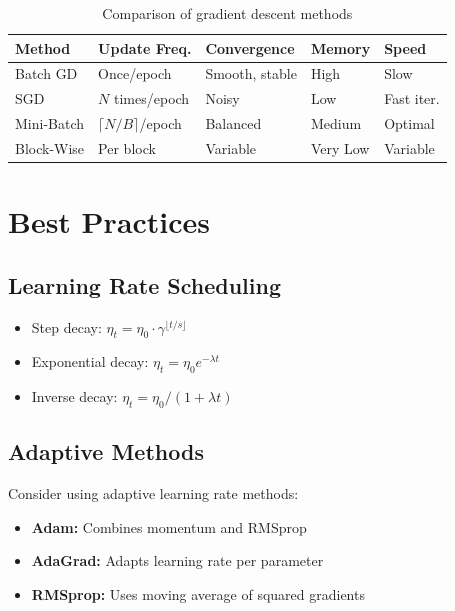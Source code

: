 \documentclass{tufte-handout}
\begin{document}
\begin{table}[h]
\centering
\begin{tabular}{|l|l|l|l|l|}
\hline
\textbf{Method} & \textbf{Update Freq.} & \textbf{Convergence} & \textbf{Memory} & \textbf{Speed} \\
\hline
Batch GD & Once/epoch & Smooth, stable & High & Slow \\
\hline
SGD & $N$ times/epoch & Noisy & Low & Fast iter. \\
\hline
Mini-Batch & $\lceil N/B \rceil$/epoch & Balanced & Medium & Optimal \\
\hline
Block-Wise & Per block & Variable & Very Low & Variable \\
\hline
\end{tabular}
\caption{Comparison of gradient descent methods}
\end{table}

\section{Best Practices}

\subsection{Learning Rate Scheduling}
\begin{itemize}
    \item Step decay: $\eta_t = \eta_0 \cdot \gamma^{\lfloor t/s \rfloor}$
    \item Exponential decay: $\eta_t = \eta_0 e^{-\lambda t}$
    \item Inverse decay: $\eta_t = \eta_0 / (1 + \lambda t)$
\end{itemize}

\subsection{Adaptive Methods}
Consider using adaptive learning rate methods:
\begin{itemize}
    \item \textbf{Adam:} Combines momentum and RMSprop
    \item \textbf{AdaGrad:} Adapts learning rate per parameter
    \item \textbf{RMSprop:} Uses moving average of squared gradients
\end{itemize}
\end{document}
